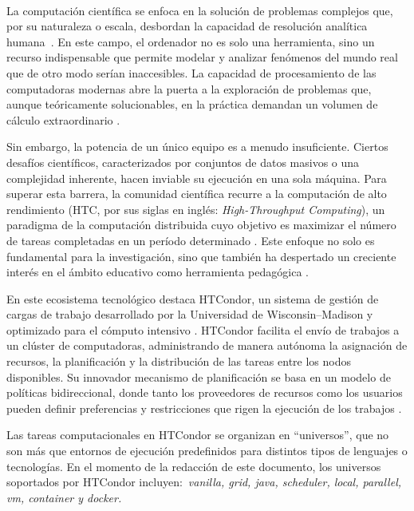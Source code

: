 \label{cap:introduccion}
\mbox{}\\

La computación científica se enfoca en la solución de problemas complejos que, por su naturaleza o escala, desbordan la capacidad de resolución analítica humana~\citep{landau01}. En este campo, el ordenador no es solo una herramienta, sino un recurso indispensable que permite modelar y analizar fenómenos del mundo real que de otro modo serían inaccesibles. La capacidad de procesamiento de las computadoras modernas abre la puerta a la exploración de problemas que, aunque teóricamente solucionables, en la práctica demandan un volumen de cálculo extraordinario \citep{landau01}.

Sin embargo, la potencia de un único equipo es a menudo insuficiente. Ciertos desafíos científicos, caracterizados por conjuntos de datos masivos o una complejidad inherente, hacen inviable su ejecución en una sola máquina. Para superar esta barrera, la comunidad científica recurre a la computación de alto rendimiento (HTC, por sus siglas en inglés: \textit{High-Throughput Computing}), un paradigma de la computación distribuida cuyo objetivo es maximizar el número de tareas completadas en un período determinado \citep{juve-01}. Este enfoque no solo es fundamental para la investigación, sino que también ha despertado un creciente interés en el ámbito educativo como herramienta pedagógica \citep{Senol-01}.

En este ecosistema tecnológico destaca HTCondor, un sistema de gestión de cargas de trabajo desarrollado por la Universidad de Wisconsin–Madison y optimizado para el cómputo intensivo \citep{chang-01, htcondor-description}. HTCondor facilita el envío de trabajos a un clúster de computadoras, administrando de manera autónoma la asignación de recursos, la planificación y la distribución de las tareas entre los nodos disponibles. Su innovador mecanismo de planificación se basa en un modelo de políticas bidireccional, donde tanto los proveedores de recursos como los usuarios pueden definir preferencias y restricciones que rigen la ejecución de los trabajos \citep{htcondor-description}.

Las tareas computacionales en HTCondor se organizan en ``universos'', que no son más que entornos de ejecución predefinidos para distintos tipos de lenguajes o tecnologías. En el momento de la redacción de este documento, los universos soportados por HTCondor incluyen:~\textit{vanilla, grid, java, scheduler, local, parallel, vm, container y docker.}
